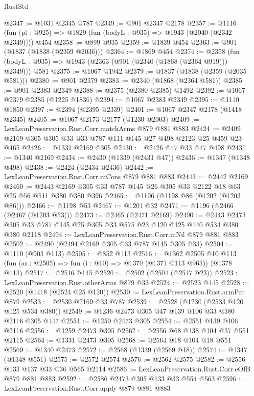 \begin{lexlean}{RustStd}
\begin{coremodule}
@2347 := @1031 @2345 @787
@2349 := @901 @2347 @2178
@2357 := @1116 (fun (pl : @925) => @1829 (fun (bodyL : @935) => @1943 (@2040 (@2342 @2349)))) @454
@2358 := @899 @935
@2359 := @1839 @454
@2363 := @901 (@1837 (@1838 (@2359 @2036)))
@2364 := @1869 @454
@2374 := @2358 (fun (bodyL : @935) => @1943 (@2363 (@901 (@2340 (@1868 (@2364 @919))) @2349))) @581
@2375 := @1067 @1942
@2379 := @1837 (@1838 (@2359 (@2035 @581)))
@2380 := @901 @2379
@2383 := @2340 (@1868 (@2364 @581))
@2385 := @901 @2383 @2349
@2388 := @2375 (@2380 @2385) @1492
@2392 := @1067 @2379 @2385 (@1225 @1836)
@2394 := @1067 @2383 @2349
@2395 := @1110 @1850
@2397 := @2394 (@2395 @2339)
@2401 := @1067 @2347 @2178 (@1418 @2345)
@2405 := @1067 @2173 @2177 (@1230 @2003)
@2409 := LexLeanPreservation.Rust.Corr.matchArms @879 @881 @883
@2424 := @2409 @2169 @305 @305 @33 @33 @787 @111 @145 @27 @498 @2123 @25 @459 @23 @465
@2426 := @1331 @2169 @305
@2430 := @2426 @47 @33 @47 @498
@2431 := @1340 @2169
@2434 := @2430 (@1339 (@2431 @47))
@2436 := @1347 (@1348 @498)
@2438 := @2424 (@2434 @2436)
@2442 := LexLeanPreservation.Rust.Corr.mCons @879 @881 @883
@2443 := @2442 @2169
@2460 := @2443 @2169 @305 @33 @787 @145 @26 @305 @33 @2122 @18 @63 @25 @56 @511 @380 @380 @396
@2465 := @1196 (@1198 @86 (@1202 (@1203 @86)))
@2466 := @1198 @53
@2467 := @1201 @32
@2471 := @1196 (@2466 (@2467 (@1203 @53)))
@2473 := @2465 (@2471 @2169)
@2490 := @2443 @2473 @305 @33 @787 @145 @25 @305 @33 @575 @23 @120 @125 @140 @534 @380 @380 @2118
@2494 := LexLeanPreservation.Rust.Corr.mNil @879 @881 @883
@2502 := @2490 (@2494 @2169 @305 @33 @787 @145 @305 @33)
@2504 := @1110 (@903 @113)
@2505 := @852 @113
@2516 := @1362
    @2505
    @10
    @113
    (fun (as : @2505) => fun (i : @10) => @1370 (@1371 @113 @963))
    (@1378 @113)
@2517 := @2516 @145
@2520 := @2502 (@2504 (@2517 @23))
@2523 := LexLeanPreservation.Rust.otherArms @879 @33
@2524 := @2523 @145
@2528 := @2520 (@1418 (@2524 @25 @120))
@2530 := LexLeanPreservation.Rust.armPat @879
@2533 := @2530 @2169 @33 @787
@2539 := @2528 (@1230 (@2533 @120 @125 @534 @380))
@2549 := @1236 @2473 @305 @47 @139 @106 @33 @380 @2116 @305 @147
@2551 := @1250 @2473 @305
@2554 := @2551 @139 @106 @2116
@2556 := @1259 @2473 @305
@2562 := @2556 @68 @138 @104 @37 @551 @2115
@2564 := @1331 @2473 @305
@2568 := @2564 @18 @104 @18 @551
@2569 := @1340 @2473
@2572 := @2568 (@1339 (@2569 @18))
@2574 := @1347 (@1348 @551)
@2575 := @2572 @2574
@2576 := @2562 @2575
@2582 := @2556 @133 @137 @33 @36 @565 @2114
@2586 := LexLeanPreservation.Rust.Corr.eOfB @879 @881 @883
@2592 := @2586 @2473 @305 @133 @33 @554 @563
@2596 := LexLeanPreservation.Rust.Corr.apply @879 @881 @883

\end{coremodule}
\end{lexlean}
